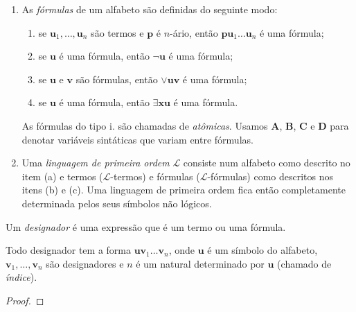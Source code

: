 \begin{definition}
\begin{enumerate}[leftmargin=*, align=left, label=\textbf{(\alph*)}]
\begin{enumerate}[label=\roman*.]
                \end{enumerate}
            Note que constantes também são termos. Usamos $\mathbf{a}$, $\mathbf{b}$, $\mathbf{c}$ e $\mathbf{d}$ para denotar variáveis sintáticas que variam entre termos.
            \item As \emph{fórmulas} de um alfabeto são definidas do seguinte modo:
                \begin{enumerate}[label=\roman*.]
                    \item se $\mathbf{u}_1, \ldots, \mathbf{u}_n$ são termos e $\mathbf{p}$ é $n$-ário, então $\mathbf{p} \mathbf{u}_1 \ldots \mathbf{u}_n$ é uma fórmula;
                    \item se $\mathbf{u}$ é uma fórmula, então $\neg \mathbf{u}$ é uma fórmula;
                    \item se $\mathbf{u}$ e $\mathbf{v}$ são fórmulas, então $\lor \mathbf{u} \mathbf{v}$ é uma fórmula;
                    \item se $\mathbf{u}$ é uma fórmula, então $\exists \mathbf{x} \mathbf{u}$ é uma fórmula.
                \end{enumerate}
            As fórmulas do tipo i. são chamadas de \emph{atômicas}. Usamos $\mathbf{A}$, $\mathbf{B}$, $\mathbf{C}$ e $\mathbf{D}$ para denotar variáveis sintáticas que variam entre fórmulas.
            \item Uma \emph{linguagem de primeira ordem} $\mathcal{L}$ consiste num alfabeto como descrito no item (a) e termos ($\mathcal{L}$-termos) e fórmulas ($\mathcal{L}$-fórmulas) como descritos nos itens (b) e (c). Uma linguagem de primeira ordem fica então completamente determinada pelos seus símbolos não lógicos.
        \end{enumerate}
\end{definition}

\begin{definition}
    Um \emph{designador} é uma expressão que é um termo ou uma fórmula.
\end{definition}

\begin{proposition}
    Todo designador tem a forma $\mathbf{u} \mathbf{v}_1 \ldots \mathbf{v}_n$, onde $\mathbf{u}$ é um símbolo do alfabeto, $\mathbf{v}_1, \ldots, \mathbf{v}_n$ são designadores e $n$ é um natural determinado por $\mathbf{u}$ (chamado de \emph{índice}).
\end{proposition}

\begin{proof}
    \blackproof
\end{proof}

